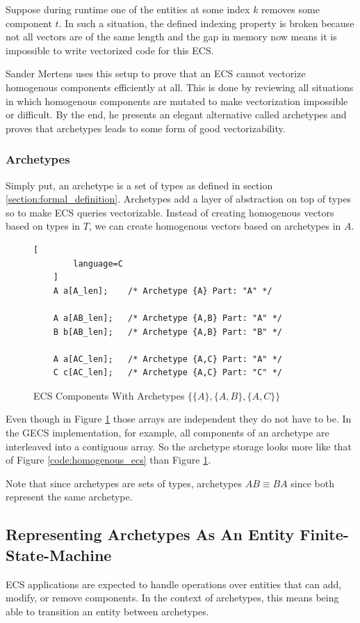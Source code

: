 Suppose during runtime one of the entities at some index $k$ removes some component $t$. In such a situation, the defined indexing property is broken because not all vectors are of the same length and the gap in memory now means it is impossible to write vectorized code for this ECS.

Sander Mertens uses this setup to prove that an ECS cannot vectorize homogenous components efficiently at all. This is done by reviewing all situations in which homogenous components are mutated to make vectorization impossible or difficult. By the end, he presents an elegant alternative called archetypes and proves that archetypes leads to some form of good vectorizability.

\subsubsection{Archetypes}
Simply put, an archetype is a set of types as defined in section \ref{section:formal_definition}. Archetypes add a layer of abstraction on top of types so to make ECS queries vectorizable. Instead of creating homogenous vectors based on types in $T$, we can create homogenous vectors based on archetypes in $A$. 

\begin{figure}[H]
    \begin{lstlisting}[
        language=C
    ]
    A a[A_len];    /* Archetype {A} Part: "A" */

    A a[AB_len];   /* Archetype {A,B} Part: "A" */
    B b[AB_len];   /* Archetype {A,B} Part: "B" */

    A a[AC_len];   /* Archetype {A,C} Part: "A" */
    C c[AC_len];   /* Archetype {A,C} Part: "C" */
    \end{lstlisting}
    \caption{ECS Components With Archetypes $\{\{A\},\{A,B\},\{A,C\}\}$}
    \label{code:ecs_archetypes}
\end{figure}

Even though in Figure \ref{code:ecs_archetypes} those arrays are independent they do not have to be. In the GECS implementation, for example, all components of an archetype are interleaved into a contiguous array. So the archetype storage looks more like that of Figure \ref{code:homogenous_ecs} than Figure \ref{code:ecs_archetypes}.

Note that since archetypes are sets of types, archetypes $AB \equiv BA$ since both represent the same archetype.

\subsection{Representing Archetypes As An Entity Finite-State-Machine}
\label{sec:fsm_arc}
ECS applications are expected to handle operations over entities that can add, modify, or remove components. In the context of archetypes, this means being able to transition an entity between archetypes. 

